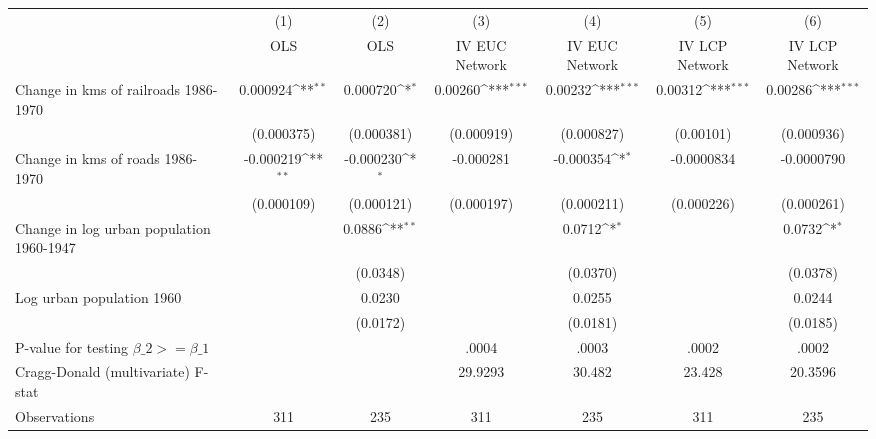 {
\def\sym#1{\ifmmode^{#1}\else\(^{#1}\)\fi}
\begin{tabular}{l*{6}{c}}
\hline\hline
                &\multicolumn{1}{c}{(1)}&\multicolumn{1}{c}{(2)}&\multicolumn{1}{c}{(3)}&\multicolumn{1}{c}{(4)}&\multicolumn{1}{c}{(5)}&\multicolumn{1}{c}{(6)}\\
                &\multicolumn{1}{c}{OLS}&\multicolumn{1}{c}{OLS}&\multicolumn{1}{c}{IV EUC Network}&\multicolumn{1}{c}{IV EUC Network}&\multicolumn{1}{c}{IV LCP Network}&\multicolumn{1}{c}{IV LCP Network}\\
\hline
Change in kms of railroads 1986-1970& 0.000924\sym{**} & 0.000720\sym{*}  &  0.00260\sym{***}&  0.00232\sym{***}&  0.00312\sym{***}&  0.00286\sym{***}\\
                &(0.000375)         &(0.000381)         &(0.000919)         &(0.000827)         &(0.00101)         &(0.000936)         \\
[1em]
Change in kms of roads 1986-1970&-0.000219\sym{**} &-0.000230\sym{*}  &-0.000281         &-0.000354\sym{*}  &-0.0000834         &-0.0000790         \\
                &(0.000109)         &(0.000121)         &(0.000197)         &(0.000211)         &(0.000226)         &(0.000261)         \\
[1em]
Change in log urban population 1960-1947&                  &   0.0886\sym{**} &                  &   0.0712\sym{*}  &                  &   0.0732\sym{*}  \\
                &                  & (0.0348)         &                  & (0.0370)         &                  & (0.0378)         \\
[1em]
Log urban population 1960&                  &   0.0230         &                  &   0.0255         &                  &   0.0244         \\
                &                  & (0.0172)         &                  & (0.0181)         &                  & (0.0185)         \\
\hline
P-value for testing $\beta\_{2} >= \beta\_{1}$&                  &                  &    .0004         &    .0003         &    .0002         &    .0002         \\
Cragg-Donald (multivariate) F-stat&                  &                  &  29.9293         &   30.482         &   23.428         &  20.3596         \\
Observations    &      311         &      235         &      311         &      235         &      311         &      235         \\
\hline\hline
\end{tabular}
}
